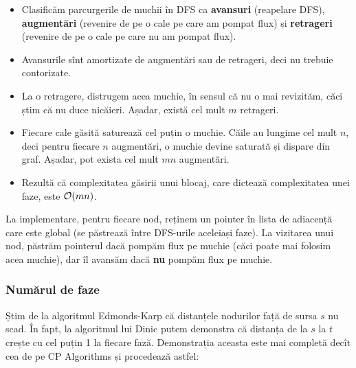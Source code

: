 \documentclass[../main.tex]{subfiles}
\begin{document}
\begin{itemize}
  \item Clasificăm parcurgerile de muchii în DFS ca \textbf{avansuri} (reapelare DFS), \textbf{augmentări} (revenire de pe o cale pe care am pompat flux) și \textbf{retrageri} (revenire de pe o cale pe care nu am pompat flux).

  \item Avansurile sînt amortizate de augmentări sau de retrageri, deci nu trebuie contorizate.

  \item La o retragere, distrugem acea muchie, în sensul că nu o mai revizităm, căci știm că nu duce nicăieri. Așadar, există cel mult $m$ retrageri.

  \item Fiecare cale găsită saturează cel puțin o muchie. Căile au lungime cel mult $n$, deci pentru fiecare $n$ augmentări, o muchie devine saturată și dispare din graf. Așadar, pot exista cel mult $mn$ augmentări.

  \item Rezultă că complexitatea găsirii unui blocaj, care dictează complexitatea unei faze, este $\mathcal{O}(mn)$.
\end{itemize}

La implementare, pentru fiecare nod, reținem un pointer în lista de adiacență care este global (se păstrează între DFS-urile aceleiași faze). La vizitarea unui nod, păstrăm pointerul dacă pompăm flux pe muchie (căci poate  mai folosim acea muchie), dar îl avansăm dacă \textbf{nu} pompăm flux pe muchie.

\subsubsection*{Numărul de faze}

Știm de la algoritmul Edmonds-Karp că distanțele nodurilor față de sursa $s$ nu scad. În fapt, la algoritmul lui Dinic putem demonstra că distanța de la $s$ la $t$ crește cu cel puțin 1 la fiecare fază. Demonstrația aceasta este mai completă decît cea de pe CP Algorithms și procedează astfel:
\end{document}
